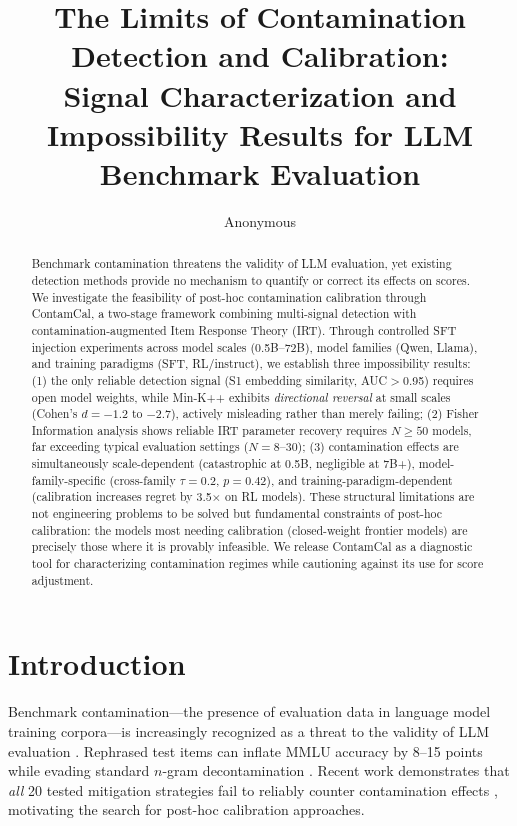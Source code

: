 \documentclass[11pt,a4paper]{article}
\title{The Limits of Contamination Detection and Calibration:\\Signal Characterization and Impossibility Results for LLM Benchmark Evaluation}
\author{Anonymous}
\date{}
\begin{document}
\maketitle

\begin{abstract}
Benchmark contamination threatens the validity of LLM evaluation, yet existing detection methods provide no mechanism to quantify or correct its effects on scores. We investigate the feasibility of post-hoc contamination calibration through ContamCal, a two-stage framework combining multi-signal detection with contamination-augmented Item Response Theory (IRT). Through controlled SFT injection experiments across model scales (0.5B--72B), model families (Qwen, Llama), and training paradigms (SFT, RL/instruct), we establish three impossibility results: (1) the only reliable detection signal (S1 embedding similarity, AUC$>$0.95) requires open model weights, while Min-K++ exhibits \emph{directional reversal} at small scales (Cohen's $d = -1.2$ to $-2.7$), actively misleading rather than merely failing; (2) Fisher Information analysis shows reliable IRT parameter recovery requires $N \geq 50$ models, far exceeding typical evaluation settings ($N = 8$--$30$); (3) contamination effects are simultaneously scale-dependent (catastrophic at 0.5B, negligible at 7B+), model-family-specific (cross-family $\tau = 0.2$, $p = 0.42$), and training-paradigm-dependent (calibration increases regret by 3.5$\times$ on RL models). These structural limitations are not engineering problems to be solved but fundamental constraints of post-hoc calibration: the models most needing calibration (closed-weight frontier models) are precisely those where it is provably infeasible. We release ContamCal as a diagnostic tool for characterizing contamination regimes while cautioning against its use for score adjustment.
\end{abstract}

\section{Introduction}

Benchmark contamination---the presence of evaluation data in language model training corpora---is increasingly recognized as a threat to the validity of LLM evaluation \citep{magar2022data,sainz2023nlp,jacovi2023stop}. Rephrased test items can inflate MMLU accuracy by 8--15 points while evading standard $n$-gram decontamination \citep{yang2023rethinking,oren2024proving}. Recent work demonstrates that \emph{all} 20 tested mitigation strategies fail to reliably counter contamination effects \citep{xu2025emperors}, motivating the search for post-hoc calibration approaches.
\end{document}
